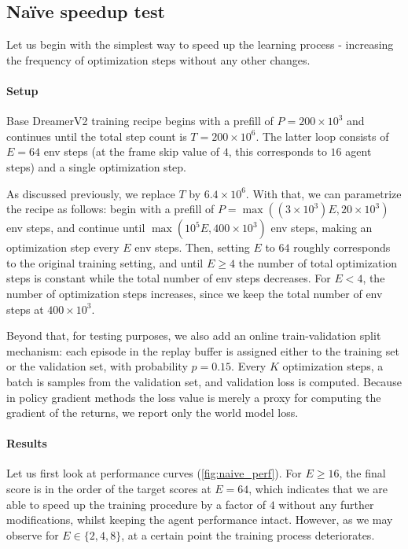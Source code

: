 \documentclass[twoside,11pt]{article}
\begin{document}
\subsection{Na\"ive speedup test}

Let us begin with the simplest way to speed up the learning process - increasing the frequency of optimization steps without any other changes.

\paragraph{Setup} Base DreamerV2 training recipe begins with a prefill of $P = 200 \times 10^3$ and continues until the total step count is $T = 200 \times 10^6$. The latter loop consists of $E = 64$ env steps (at the frame skip value of $4$, this corresponds to $16$ agent steps) and a single optimization step.

As discussed previously, we replace $T$ by $6.4 \times 10^6$. With that, we can parametrize the recipe as follows: begin with a prefill of $P = \max((3 \times 10^3)E, 20 \times 10^3)$ env steps, and continue until $\max(10^5 E, 400 \times 10^3)$ env steps, making an optimization step every $E$ env steps. Then, setting $E$ to $64$ roughly corresponds to the original training setting, and until $E \geq 4$ the number of total optimization steps is constant while the total number of env steps decreases. For $E < 4$, the number of optimization steps increases, since we keep the total number of env steps at $400 \times 10^3$.

Beyond that, for testing purposes, we also add an online train-validation split mechanism: each episode in the replay buffer is assigned either to the training set or the validation set, with probability $p = 0.15$. Every $K$ optimization steps, a batch is samples from the validation set, and validation loss is computed. Because in policy gradient methods the loss value is merely a proxy for computing the gradient of the returns, we report only the world model loss.

\paragraph{Results} Let us first look at performance curves (\autoref{fig:naive_perf}). For $E \geq 16$, the final score is in the order of the target scores at $E = 64$, which indicates that we are able to speed up the training procedure by a factor of $4$ without any further modifications, whilst keeping the agent performance intact. However, as we may observe for $E \in \{2, 4, 8\}$, at a certain point the training process deteriorates.
\end{document}
